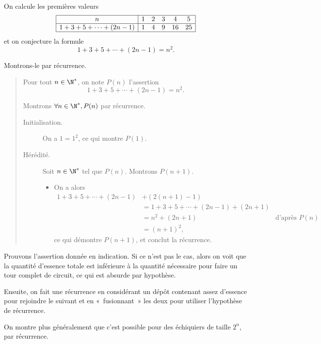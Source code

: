 \begin{Soln}{32}
On calcule les premières valeurs
\[ \begin{array}{|c|ccccc|} \hline n & 1 & 2 & 3 & 4 & 5 \\ \hline 1 + 3 + 5 + \cdots + (2n-1) & 1 & 4 & 9 & 16 & 25  \\ \hline \end{array}\]
et on conjecture la formule
\[ 1 + 3 + 5 + \cdots + (2n-1) = n^2.\]

Montrons-le par récurrence.

\begin{quote}
  Pour tout $n \in \N^*$, on note $P(n)$ l'assertion
  \[ 1 + 3 + 5 + \cdots + (2n-1) = n^2.\]

  Montrons $\forall n \in \N^*, P(n)$ par récurrence.

  \begin{description}
  \item[Initialisation.] On a $1 = 1^2$, ce qui montre $P(1)$.
  \item[Hérédité.] Soit $n \in \N^*$ tel que $P(n)$. Montrons $P(n+1)$.
    \begin{itemize}
    \item [] On a alors
      \begin{align*}
        1 + 3 + 5 + \cdots + (2n-1) &+ (2(n+1) - 1) \\
     &= 1 + 3 + 5 + \cdots + (2n-1) + (2n+1) \\
                                                   &= n^2 + (2n+1) & \text{d'après $P(n)$}\\
        &= (n+1)^2,
      \end{align*}
      ce qui démontre $P(n+1)$, et conclut la récurrence.
    \end{itemize}
  \end{description}
\end{quote}
\end{Soln}
\begin{Soln}{33}
Prouvons l'assertion donnée en indication. Si ce n'est pas le cas, alors on voit que la quantité d'essence totale est inférieure à la quantité nécessaire pour faire un tour complet de circuit, ce qui est absurde par hypothèse.

Ensuite, on fait une récurrence en considérant un dépôt contenant assez d'essence pour rejoindre le suivant et en «~fusionnant~» les deux pour utiliser l'hypothèse de récurrence.
\end{Soln}
\begin{Soln}{34}
On montre plus généralement que c'est possible pour des échiquiers de taille $2^n$, par récurrence.
\end{Soln}
